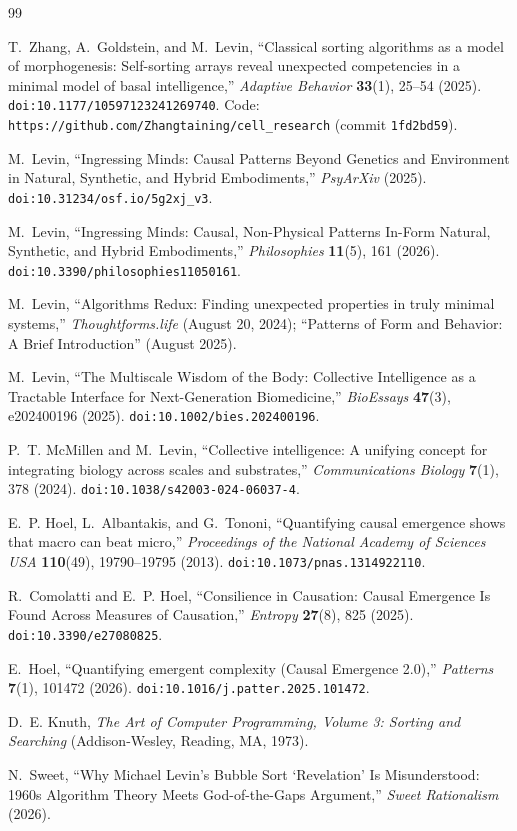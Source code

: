 \documentclass[11pt,a4paper]{article}
\theoremstyle{definition}
\theoremstyle{remark}
\begin{document}
\begin{thebibliography}{99}

T.~Zhang, A.~Goldstein, and M.~Levin, ``Classical sorting algorithms as a model of morphogenesis: Self-sorting arrays reveal unexpected competencies in a minimal model of basal intelligence,'' \emph{Adaptive Behavior} \textbf{33}(1), 25--54 (2025). \texttt{doi:10.1177/10597123241269740}. Code: \texttt{https://github.com/Zhangtaining/cell\_research} (commit \texttt{1fd2bd59}).

M.~Levin, ``Ingressing Minds: Causal Patterns Beyond Genetics and Environment in Natural, Synthetic, and Hybrid Embodiments,'' \emph{PsyArXiv} (2025). \texttt{doi:10.31234/osf.io/5g2xj\_v3}.

M.~Levin, ``Ingressing Minds: Causal, Non-Physical Patterns In-Form Natural, Synthetic, and Hybrid Embodiments,'' \emph{Philosophies} \textbf{11}(5), 161 (2026). \texttt{doi:10.3390/philosophies11050161}.

M.~Levin, ``Algorithms Redux: Finding unexpected properties in truly minimal systems,'' \emph{Thoughtforms.life} (August 20, 2024); ``Patterns of Form and Behavior: A Brief Introduction'' (August 2025).

M.~Levin, ``The Multiscale Wisdom of the Body: Collective Intelligence as a Tractable Interface for Next-Generation Biomedicine,'' \emph{BioEssays} \textbf{47}(3), e202400196 (2025). \texttt{doi:10.1002/bies.202400196}.

P.~T. McMillen and M.~Levin, ``Collective intelligence: A unifying concept for integrating biology across scales and substrates,'' \emph{Communications Biology} \textbf{7}(1), 378 (2024). \texttt{doi:10.1038/s42003-024-06037-4}.

E.~P. Hoel, L.~Albantakis, and G.~Tononi, ``Quantifying causal emergence shows that macro can beat micro,'' \emph{Proceedings of the National Academy of Sciences USA} \textbf{110}(49), 19790--19795 (2013). \texttt{doi:10.1073/pnas.1314922110}.

R.~Comolatti and E.~P. Hoel, ``Consilience in Causation: Causal Emergence Is Found Across Measures of Causation,'' \emph{Entropy} \textbf{27}(8), 825 (2025). \texttt{doi:10.3390/e27080825}.

E.~Hoel, ``Quantifying emergent complexity (Causal Emergence 2.0),'' \emph{Patterns} \textbf{7}(1), 101472 (2026). \texttt{doi:10.1016/j.patter.2025.101472}.

D.~E. Knuth, \emph{The Art of Computer Programming, Volume 3: Sorting and Searching} (Addison-Wesley, Reading, MA, 1973).

N.~Sweet, ``Why Michael Levin's Bubble Sort `Revelation' Is Misunderstood: 1960s Algorithm Theory Meets God-of-the-Gaps Argument,'' \emph{Sweet Rationalism} (2026).

\end{thebibliography}
\end{document}
